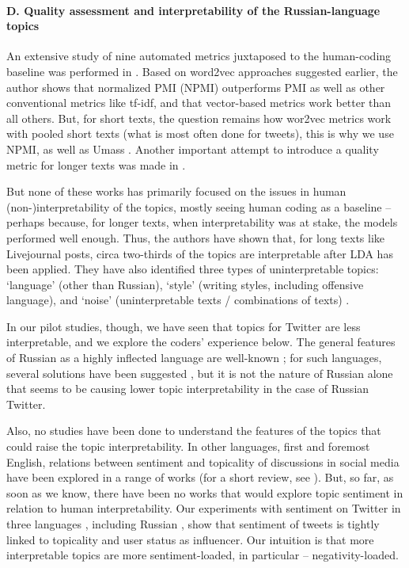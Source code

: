 \paragraph{D. Quality assessment and interpretability of the Russian-language topics}
An extensive study of nine automated metrics juxtaposed to the human-coding baseline was performed in \cite{Nikolenko}. Based on word2vec approaches suggested earlier, the author shows that normalized PMI (NPMI) outperforms PMI as well as other conventional metrics like tf-idf, and that vector-based metrics work better than all others. But, for short texts, the question remains how wor2vec metrics work with pooled short texts (what is most often done for tweets), this is why we use NPMI, as well as Umass \cite{BodrunovaKoltcovKoltsova}. Another important attempt to introduce a quality metric for longer texts was made in \cite{MavrinFilchenkovKoltcov}.

But none of these works has primarily focused on the issues in human (non-)interpretability of the topics, mostly seeing human coding as a baseline -- perhaps because, for longer texts, when interpretability was at stake, the models performed well enough. Thus, the authors \cite{KoltsovaKoltcov} have shown that, for long texts like Livejournal posts, circa two-thirds of the topics are interpretable after LDA has been applied. They have also identified three types of uninterpretable topics: ‘language’ (other than Russian), ‘style’ (writing styles, including offensive language), and ‘noise’ (uninterpretable texts / combinations of texts) \cite[p.~218]{KoltsovaKoltcov}.

In our pilot studies, though, we have seen that topics for Twitter are less interpretable, and we explore the coders’ experience below. The general features of Russian as a highly inflected language are well-known \cite{Whittaker}; for such languages, several solutions have been suggested \cite{MaucecKacicHorvat}, but it is not the nature of Russian alone that seems to be causing lower topic interpretability in the case of Russian Twitter.

Also, no studies have been done to understand the features of the topics that could raise the topic interpretability. In other languages, first and foremost English, relations between sentiment and topicality of discussions in social media have been explored in a range of works (for a short review, see \cite{XiangZhou}). But, so far, as soon as we know, there have been no works that would explore topic sentiment in relation to human interpretability. Our experiments with sentiment on Twitter in three languages \cite{BlekanovKukarkinMaksimov,BodrunovaBlekanovKukarkin2018}, including Russian \cite{BodrunovaLitvinenkoBlekanov2017,NigmatullinaBodrunova}, show that sentiment of tweets is tightly linked to topicality and user status as influencer. Our intuition is that more interpretable topics are more sentiment-loaded, in particular -- negativity-loaded.

